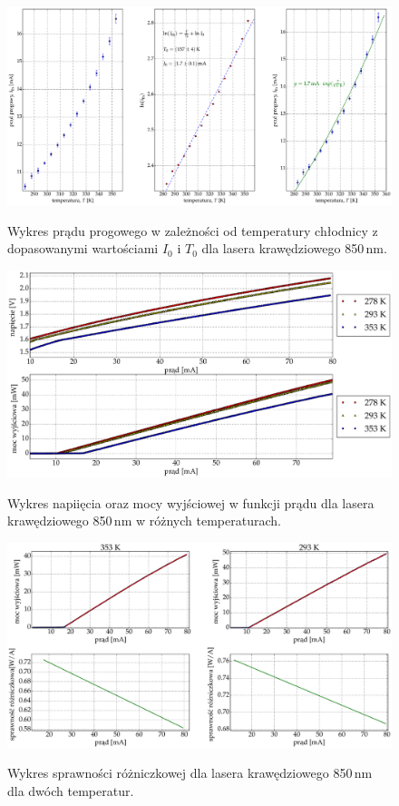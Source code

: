 \begin{figure}
\center
  \includegraphics[scale=0.30]{plot_edge_850/plot_fit.eps}
  \label{rys1}
  \caption{Wykres prądu progowego w zależności od temperatury chłodnicy z dopasowanymi wartościami $I_{0}$ i $T_{0}$ dla lasera krawędziowego 850\,nm.}
  \label{fig:plot_fit_850}
\end{figure}
\begin{figure}
\center
  \includegraphics[scale=0.30]{plot_edge_850/plot_i_v_i_l.eps}
  \label{rys1}
  \caption{Wykres napiięcia oraz mocy wyjściowej w funkcji prądu dla lasera krawędziowego 850\,nm w różnych temperaturach.}
  \label{fig:plot_i_v_i_l_850}
\end{figure}
\begin{figure}
\center
  \includegraphics[scale=0.30]{plot_edge_850/eff_via_current4.eps}
  \label{rys1}
  \caption{Wykres sprawności różniczkowej dla lasera krawędziowego 850\,nm dla dwóch temperatur.}
  \label{fig:eff_via_current4_850}
\end{figure}
